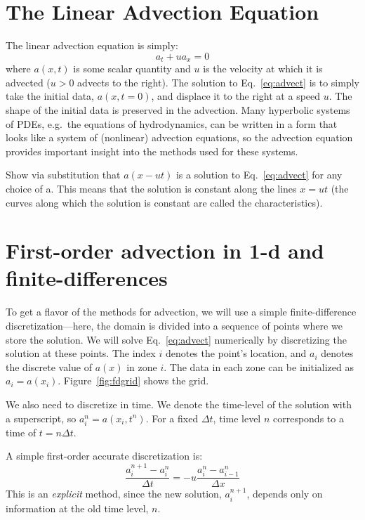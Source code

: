 \label{ch:advection}


\section{The Linear Advection Equation}

The linear advection equation is simply:
\begin{equation}
\label{eq:advect}
a_t + u a_x = 0
\end{equation}
where $a(x,t)$ is some scalar quantity and $u$ is the velocity at
which it is advected ($u > 0$ advects to the right).  The solution to
Eq.~\ref{eq:advect} is to simply take the initial data, $a(x,t=0)$,
and displace it to the right at a speed $u$.  The shape of the initial
data is preserved in the advection.  Many hyperbolic systems of PDEs,
e.g.\ the equations of hydrodynamics, can be written in a form that
looks like a system of (nonlinear) advection equations, so the
advection equation provides important insight into the methods used
for these systems.
%
\begin{exercise}
{Show via substitution that $a(x - ut)$ is a solution to
  Eq.~\ref{eq:advect} for any choice of a.  This means that
the solution is constant along the lines $x = u t$
(the curves along which the solution is constant are called the
characteristics).}
\end{exercise}

\section{First-order advection in 1-d and finite-differences}

To get a flavor of the methods for advection, we will use a simple
finite-difference discretization---here, the domain is divided into
a sequence of points where we store the solution.
We will solve
Eq.~\ref{eq:advect} numerically by discretizing the solution at
these points.  The index $i$ denotes the point's location, and $a_i$
denotes the discrete value of $a(x)$ in zone $i$.  The data in each
zone can be initialized as $a_i = a(x_i)$.  Figure~\ref{fig:fdgrid}
shows the grid.

We also need to discretize in time.  We denote the time-level of the
solution with a superscript, so $a_i^n = a(x_i,t^n)$.  For a fixed
$\Delta t$, time level $n$ corresponds to a time of $t = n\Delta t$.


A simple first-order accurate discretization is:
\begin{equation}
\frac{a_i^{n+1} - a_i^n}{\Delta t} = - u \frac{a_i^n - a_{i-1}^n}{\Delta x}
\label{eq:fo}
\end{equation}
This is an {\em explicit} method, since the new solution, $a_i^{n+1}$,
depends only on information at the old time level, $n$.  

